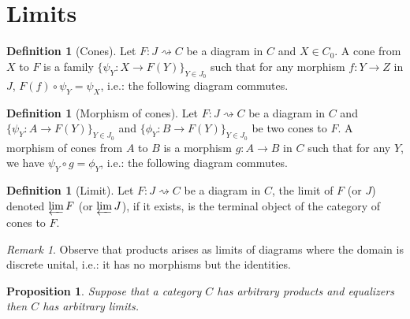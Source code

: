\documentclass{scrartcl}
\newtheorem{prop}[thm]{Proposition}
\theoremstyle{definition}
\newtheorem{defn}[thm]{Definition}
\theoremstyle{remark}
\newtheorem{rem}[thm]{Remark}
\begin{document}
\section{Limits}
\begin{defn}[Cones]
    Let $F: J \rightsquigarrow C$ be a diagram in $C$ and $X \in C_0$. A cone from $X$ to $F$ is a family $\{\psi_Y : X \rightarrow F(Y)\}_{Y \in J_0}$ such that for any morphism $f: Y \rightarrow Z$ in $J$, $F(f) \circ \psi_Y = \psi_X$, i.e.: the following diagram commutes.
    \begin{figure}[h]
        \centering
    \end{figure}
\end{defn}
\begin{defn}[Morphism of cones]
    Let $F:J\rightsquigarrow C$ be a diagram in $C$ and $\{\psi_Y: A \rightarrow F(Y)\}_{Y \in J_0}$ and $\{\phi_Y: B\rightarrow F(Y)\}_{Y \in J_0}$ be two cones to $F$. A morphism of cones from $A$ to $B$ is a morphism $g:A\rightarrow B$ in $C$ such that for any $Y$, we have $\psi_Y \circ g = \phi_Y$, i.e.: the following diagram commutes.
    \begin{figure}[h]
        \centering
    \end{figure}
\end{defn}
\begin{defn}[Limit]
    Let $F:J \rightsquigarrow C$ be a diagram in $C$, the limit of $F$ (or $J$) denoted $\varprojlim F$ (or $\varprojlim J$), if it exists, is the terminal object of the category of cones to $F$.
\end{defn}
\begin{rem}
    Observe that products arises as limits of diagrams where the domain is discrete unital, i.e.: it has no morphisms but the identities.
\end{rem}
\begin{prop}
    Suppose that a category $C$ has arbitrary products and equalizers then $C$ has arbitrary limits.
\end{prop}
\end{document}
